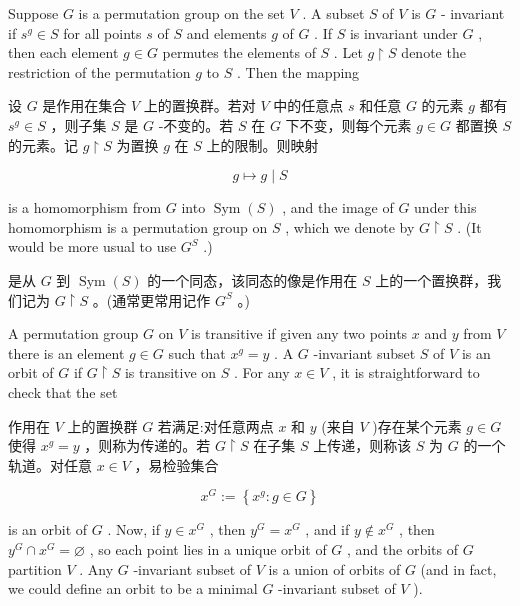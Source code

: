 \documentclass[10pt]{article}
\begin{document}
Suppose \(G\) is a permutation group on the set \(V\) . A subset \(S\) of \(V\) is \(G\) - invariant if \({s}^{g} \in  S\) for all points \(s\) of \(S\) and elements \(g\) of \(G\) . If \(S\) is invariant under \(G\) , then each element \(g \in  G\) permutes the elements of \(S\) . Let \(g \upharpoonright  S\) denote the restriction of the permutation \(g\) to \(S\) . Then the mapping

\begin{tcolorbox}\relax
设 \(G\) 是作用在集合 \(V\) 上的置换群。若对 \(V\) 中的任意点 \(s\) 和任意 \(G\) 的元素 \(g\) 都有 \({s}^{g} \in  S\) ，则子集 \(S\) 是 \(G\) -不变的。若 \(S\) 在 \(G\) 下不变，则每个元素 \(g \in  G\) 都置换 \(S\) 的元素。记 \(g \upharpoonright  S\) 为置换 \(g\) 在 \(S\) 上的限制。则映射
\end{tcolorbox}

\[
g \mapsto  g \mid  S
\]

is a homomorphism from \(G\) into \(\operatorname{Sym}\left( S\right)\) , and the image of \(G\) under this homomorphism is a permutation group on \(S\) , which we denote by \(G \upharpoonright  S\) . (It would be more usual to use \({G}^{S}\) .)

\begin{tcolorbox}\relax
是从 \(G\) 到 \(\operatorname{Sym}\left( S\right)\) 的一个同态，该同态的像是作用在 \(S\) 上的一个置换群，我们记为 \(G \upharpoonright  S\) 。(通常更常用记作 \({G}^{S}\) 。)
\end{tcolorbox}

A permutation group \(G\) on \(V\) is transitive if given any two points \(x\) and \(y\) from \(V\) there is an element \(g \in  G\) such that \({x}^{g} = y\) . A \(G\) -invariant subset \(S\) of \(V\) is an orbit of \(G\) if \(G \upharpoonright  S\) is transitive on \(S\) . For any \(x \in  V\) , it is straightforward to check that the set

\begin{tcolorbox}\relax
作用在 \(V\) 上的置换群 \(G\) 若满足:对任意两点 \(x\) 和 \(y\) (来自 \(V\) )存在某个元素 \(g \in  G\) 使得 \({x}^{g} = y\) ，则称为传递的。若 \(G \upharpoonright  S\) 在子集 \(S\) 上传递，则称该 \(S\) 为 \(G\) 的一个轨道。对任意 \(x \in  V\) ，易检验集合
\end{tcolorbox}

\[
{x}^{G} \mathrel{\text{ := }} \left\{  {{x}^{g} : g \in  G}\right\}
\]

is an orbit of \(G\) . Now, if \(y \in  {x}^{G}\) , then \({y}^{G} = {x}^{G}\) , and if \(y \notin  {x}^{G}\) , then \({y}^{G} \cap  {x}^{G} = \varnothing\) , so each point lies in a unique orbit of \(G\) , and the orbits of \(G\) partition \(V\) . Any \(G\) -invariant subset of \(V\) is a union of orbits of \(G\) (and in fact, we could define an orbit to be a minimal \(G\) -invariant subset of \(V\) ).
\end{document}

